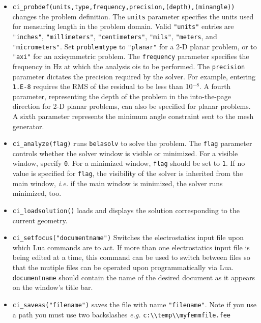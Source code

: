 \begin{itemize}
\item {\tt ci\_probdef(units,type,frequency,precision,(depth),(minangle))} changes the problem
definition. The \texttt{units} parameter specifies the units used
for measuring length in the problem domain. Valid \texttt{"units"}
entries are
\texttt{"inches"}, \texttt{"millimeters"}, \texttt{"centimeters"},
\texttt{"mils"}, \texttt{"meters}, and \texttt{"micrometers"}. Set
\texttt{problemtype} to \texttt{"planar"} for a 2-D planar problem, or to
\texttt{"axi"} for an axisymmetric problem. The \texttt{frequency} parameter specifies the frequency
in Hz at which the analysis ois to be performed. The \texttt{precision} parameter
dictates the precision required by the solver. For example, entering
\texttt{1.E-8} requires the RMS of the residual to be less than 10$^{ - 8}$.
A fourth parameter, representing the depth of the problem in the
into-the-page direction for 2-D planar problems, can also be specified
for planar problems. A sixth parameter represents the minimum angle constraint sent to the mesh generator.

\item {\tt ci\_analyze(flag)} runs \texttt{belasolv} to solve the problem. 
The {\tt flag} parameter
controls whether the solver window is visible or minimized.  For a
visible window,  specify {\tt 0}. For a minimized window, {\tt flag} should be set to {\tt 1}.
If no value is specified for {\tt flag}, the visibility of the solver is inherited from the main window,
{\em i.e.} if the main window is minimized, the solver runs minimized, too.

\item {\tt ci\_loadsolution()} loads and displays the solution corresponding to the
current geometry.

\item {\tt ci\_setfocus("documentname")} Switches the
electrostatics input file upon which Lua commands are to act. If
more than one electrostatics input file is being edited at a time,
this command can be used to switch between files so that the
mutiple files can be operated upon programmatically via Lua. {\tt
documentname} should contain the name of the desired document as
it appears on the window's title bar.

\item {\tt ci\_saveas("filename")} saves the file with name
\texttt{"filename"}. Note if you use a path you must use two backslashes
{\em e.g.} \verb+c:\\temp\\myfemmfile.fee+

\end{itemize}

